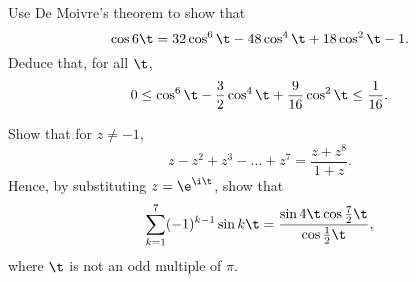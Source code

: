 \begin{problem}
    Use De Moivre's theorem to show that \[\cos 6\t = 32 \cos^6 \t - 48 \cos^4 \t + 18\cos^2 \t - 1.\] Deduce that, for all $\t$, \[0 \leq \cos^6 \t - \frac32 \cos^4 \t + \frac9{16} \cos^2 \t \leq \frac1{16}.\]
\end{problem}

\begin{problem}
    Show that for $z \neq -1$, \[z - z^2 + z^3 - \dots + z^7 = \frac{z + z^8}{1 + z}.\] Hence, by substituting $z = \e^{\i \t}$, show that \[\sum_{k=1}^7 (-1)^{k-1} \sin k\t = \frac{\sin 4\t \cos \frac72 \t}{\cos \frac12 \t},\] where $\t$ is not an odd multiple of $\pi$.
\end{problem}